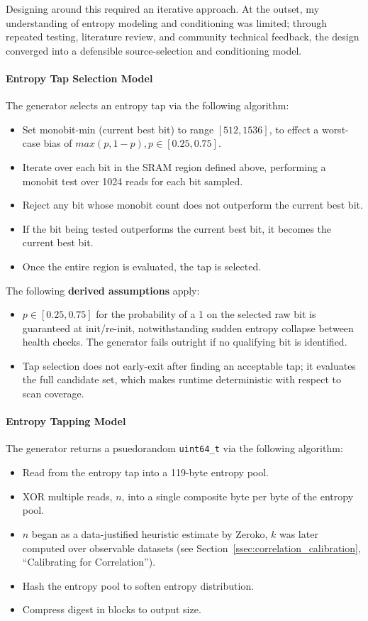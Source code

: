 \documentclass[titlepage]{report}
\begin{document}
	Designing around this required an iterative approach. At the outset, my understanding of entropy modeling and conditioning was limited; through repeated testing, literature review, and community technical feedback, the design converged into a defensible source-selection and conditioning model.
	
	\paragraph{Entropy Tap Selection Model}
	The generator selects an entropy tap via the following algorithm:
	\begin{itemize}
		\item Set monobit-min (current best bit) to range $[512, 1536]$, to effect a worst-case bias of $max(p, 1-p), p \in [0.25, 0.75]$.
		\item Iterate over each bit in the SRAM region defined above, performing a monobit test over 1024 reads for each bit sampled.
		\item Reject any bit whose monobit count does not outperform the current best bit.
		\item If the bit being tested outperforms the current best bit, it becomes the current best bit.
		\item Once the entire region is evaluated, the tap is selected.
	\end{itemize}
	
		The following \textbf{derived assumptions} apply:
		\begin{itemize}
		\item $p \in [0.25, 0.75]$ for the probability of a 1 on the selected raw bit is guaranteed at init/re-init, notwithstanding sudden entropy collapse between health checks. The generator fails outright if no qualifying bit is identified.
		\item Tap selection does not early-exit after finding an acceptable tap; it evaluates the full candidate set, which makes runtime deterministic with respect to scan coverage.
		\end{itemize}
	
	\paragraph{Entropy Tapping Model}
	The generator returns a psuedorandom \texttt{uint64\_t} via the following algorithm:
	\begin{itemize}
		\item Read from the entropy tap into a 119-byte entropy pool.
		\item XOR multiple reads, $n$, into a single composite byte per byte of the entropy pool.
		\item $n$ began as a data-justified heuristic estimate by Zeroko, $k$ was later computed over observable datasets (see Section~\ref{ssec:correlation_calibration}, “Calibrating for Correlation”).
		\item Hash the entropy pool to soften entropy distribution.
		\item Compress digest in blocks to output size.
	\end{itemize}
	
\end{document}
